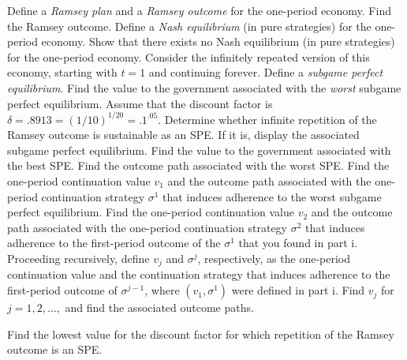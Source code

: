 \medskip
{}  Define a {\it Ramsey plan\/} and a {\it Ramsey outcome\/}
for the one-period economy.  Find the Ramsey outcome.
\smallskip
{}  Define a {\it Nash equilibrium\/} (in pure strategies) for the
 one-period economy.
\smallskip
{}  Show that there exists no Nash equilibrium (in pure strategies)
for the one-period economy.
\smallskip
{}  Consider the infinitely repeated version of this economy, starting
with $t=1$ and continuing forever.
Define a {\it subgame perfect equilibrium}.
\smallskip
{}  Find the value to the government associated with the
{\it worst\/} subgame perfect equilibrium.
\smallskip
{} Assume that the discount factor is $\delta = .8913
= (1/10)^{1/20}=.1^{.05}$.
 Determine whether infinite repetition of the Ramsey outcome
is sustainable as an SPE.  If it is,
display the associated subgame perfect equilibrium.
\smallskip
{} Find the value to the government associated with the best
SPE.
\smallskip
{}  Find the outcome path associated with the worst SPE.
\smallskip
{}  Find the one-period continuation value $v_1$ and
the outcome path associated with
the one-period continuation strategy $\sigma^1$ that induces
adherence to the worst subgame perfect equilibrium.
\smallskip
{}  Find the one-period continuation value $v_2$ and
the outcome path associated with the one-period continuation
strategy $\sigma^2$ that induces adherence to the
first-period outcome of the $\sigma^1$ that you found in part i.
\smallskip
{} Proceeding recursively, define $v_j$ and $\sigma^j$, respectively,
as the one-period continuation value and the continuation strategy
that induces adherence to the first-period outcome of $\sigma^{j-1}$,
where $(v_1, \sigma^1)$ were defined in part i.  Find $v_j$ for
$j= 1, 2, \ldots,$ and find the associated outcome paths.

\smallskip
{}  Find the lowest value for the discount factor for which repetition
of the Ramsey outcome is an SPE.


